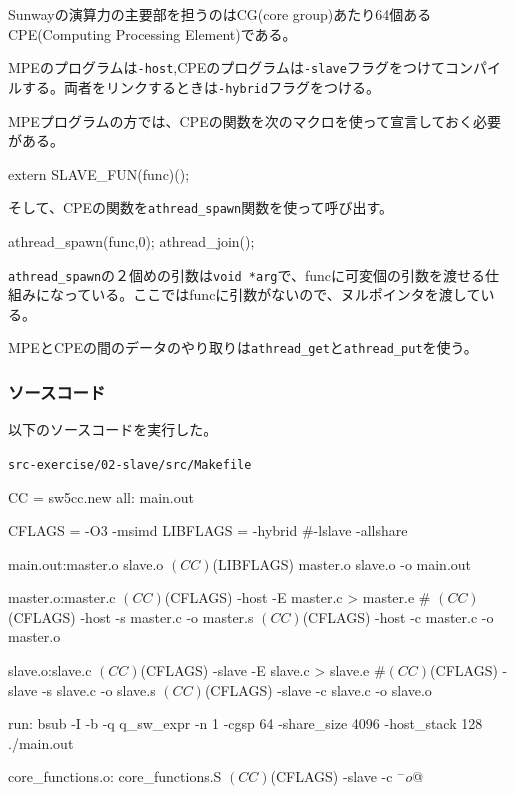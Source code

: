 Sunwayの演算力の主要部を担うのはCG(core group)あたり64個あるCPE(Computing Processing Element)である。

MPEのプログラムは\verb`-host`,CPEのプログラムは\verb`-slave`フラグをつけてコンパイルする。両者をリンクするときは\verb`-hybrid`フラグをつける。

MPEプログラムの方では、CPEの関数を次のマクロを使って宣言しておく必要がある。

\begin{code}
extern SLAVE_FUN(func)();
\end{code}

そして、CPEの関数を\verb`athread_spawn`関数を使って呼び出す。

\begin{code}
athread_spawn(func,0);
athread_join();
\end{code}

\verb`athread_spawn`の２個めの引数は\verb`void *arg`で、funcに可変個の引数を渡せる仕組みになっている。ここではfuncに引数がないので、ヌルポインタを渡している。

MPEとCPEの間のデータのやり取りは\verb`athread_get`と\verb`athread_put`を使う。




\subsubsection{ソースコード}
以下のソースコードを実行した。

\verb`src-exercise/02-slave/src/Makefile`
\begin{code}
CC = sw5cc.new
all: main.out

CFLAGS = -O3 -msimd
LIBFLAGS = -hybrid #-lslave -allshare

main.out:master.o slave.o
	$(CC) $(LIBFLAGS) master.o slave.o -o main.out

master.o:master.c
	$(CC) $(CFLAGS) -host -E master.c > master.e
	#	$(CC) $(CFLAGS) -host -s master.c -o master.s
	$(CC) $(CFLAGS) -host -c master.c -o master.o

slave.o:slave.c
	$(CC) $(CFLAGS) -slave -E slave.c > slave.e
	#$(CC) $(CFLAGS) -slave -s slave.c -o slave.s
	$(CC) $(CFLAGS) -slave -c slave.c -o slave.o

run:
	bsub -I -b -q q_sw_expr -n 1 -cgsp 64 -share_size 4096 -host_stack 128 ./main.out

core_functions.o: core_functions.S
	$(CC) $(CFLAGS) -slave -c $^ -o $@

\end{code}

